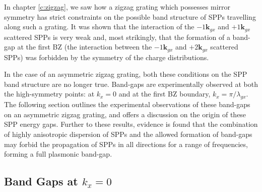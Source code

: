 In chapter \ref{c:zigzag}, we saw how a zigzag grating which possesses mirror symmetry has strict constraints on the possible band structure of SPPs travelling along such a grating. It was shown that the interaction of the $-1\mathbf{k}_{gx}$ and $+1\mathbf{k}_{gx}$ scattered SPPs is very weak and, most strikingly, that the formation of a band-gap at the first BZ (the interaction between the $-1\mathbf{k}_{gx}$ and $+2\mathbf{k}_{gx}$ scattered SPPs) was forbidden by the symmetry of the charge distributions. 

In the case of an asymmetric zigzag grating, both these conditions on the SPP band structure are no longer true. Band-gaps are experimentally observed at both the high-symmetry points: at $k_x=0$ and at the first BZ boundary, $k_x=\pi/\lambda_{gx}$. The following section outlines the experimental observations of these band-gaps on an asymmetric zigzag grating, and offers a discussion on the origin of these SPP energy gaps. Further to these results, evidence is found that the combination of highly anisotropic dispersion of SPPs and the allowed formation of band-gaps may forbid the propagation of SPPs in all directions for a range of frequencies, forming a full plasmonic band-gap. 

\subsection{Band Gaps at $k_x=0$}

